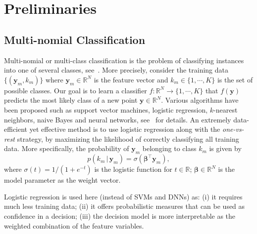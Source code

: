 \section{Preliminaries}\label{sec:preliminary}



\subsection{Multi-nomial Classification}\label{subsec:classification}
Multi-nomial or multi-class classification is the problem of classifying instances into one of several classes, see~\cite{bishop2006pattern}.
More precisely, consider the training data $\{(\boldsymbol{y}_m, k_m)\}$ where $\boldsymbol{y}_m\in \mathbb{R}^N$ is the feature vector and $k_m\in \{1,\cdots,K\}$ is the set of possible classes. 
Our goal is to learn a classifier $f:\mathbb{R}^N \rightarrow \{1,\cdots,K\}$ that $f(\boldsymbol{y})$ predicts the most likely class of a new point $\boldsymbol{y}\in \mathbb{R}^N$.
Various algorithms have been proposed such as support vector machines, logistic regression, $k$-nearest neighbors, naive Bayes and neural networks, see~\cite{bishop2006pattern} for details.
An extremely data-efficient yet effective method is to use logistic regression along with the \emph{one-vs-rest} strategy, by maximizing the likelihood of correctly classifying all training data.
More specifically, the probability of $\boldsymbol{y}_m$ belonging to class $k_m$ is given by
\begin{equation}\label{eq:log}
p(k_m \,|\, \boldsymbol{y}_m) = \sigma(\boldsymbol{\beta}^{\intercal} \boldsymbol{y}_m),
\end{equation}
where $\sigma(t)=1/(1+e^{-t})$ is the logistic function for $t\in \mathbb{R}$;
$\boldsymbol{\beta}\in \mathbb{R}^N$ is the model parameter as the weight vector.

Logistic regression is used here (instead of SVMs and DNNs) as: 
(i) it requires much less training data;
(ii) it offers probabilistic measures that can be used as confidence in a decision;
(iii) the decision model is more interpretable as the weighted combination of the feature variables.


